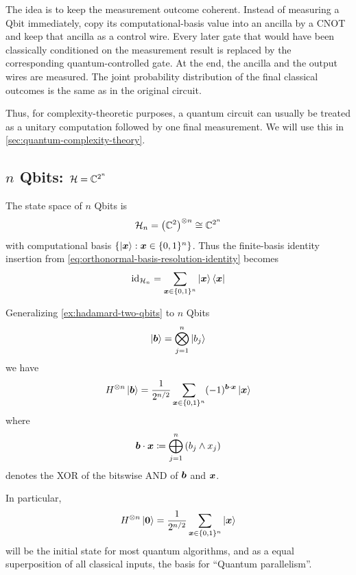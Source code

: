 The idea is to keep the measurement outcome coherent.
Instead of measuring a Qbit immediately, copy its computational-basis value into an ancilla by a CNOT and keep that ancilla as a control wire.
Every later gate that would have been classically conditioned on the measurement result is replaced by the corresponding quantum-controlled gate.
At the end, the ancilla and the output wires are measured.
The joint probability distribution of the final classical outcomes is the same as in the original circuit.

Thus, for complexity-theoretic purposes, a quantum circuit can usually be treated as a unitary computation followed by one final measurement. We will use this in \autoref{sec:quantum-complexity-theory}.



\subsection{$n$ Qbits: $\mathcal{H} = \mathbb{C}^{2^n}$}
\label{sec:n-Qbits}

The state space of \(n\) Qbits is
\[
\mathcal H_n
=
\left(\mathbb{C}^2\right)^{\otimes n}
\cong
\mathbb{C}^{2^n}
\]
with computational basis 
$
\left\{\ket{{\boldsymbol{x}}}:{\boldsymbol{x}}\in\{0,1\}^n\right\}
$.
Thus the finite-basis identity insertion from \eqref{eq:orthonormal-basis-resolution-identity} becomes
\begin{equation}\label{eq:computational-basis-resolution-identity}
\operatorname{id}_{\mathcal H_n}
=
\sum_{{\boldsymbol{x}}\in\{0,1\}^{n}}\ket{{\boldsymbol{x}}}\bra{{\boldsymbol{x}}} 
\end{equation}


\begin{example}\label{ex:hadamard-n-qbits}
Generalizing \autoref{ex:hadamard-two-qbits} to \(n\) Qbits
\[
\ket{{\boldsymbol{b}}} = \bigotimes_{j=1}^n \ket{b_j}
\]
we have
\begin{equation}\label{eq:nfold-hadamard-general}
H^{\otimes n}\ket{{\boldsymbol{b}}}=\frac{1}{2^{n / 2}} \sum_{{\boldsymbol{x}} \in \{0,1\}^n}(-1)^{{\boldsymbol{b}} \cdot {\boldsymbol{x}}}\ket{{\boldsymbol{x}}}
\end{equation}
where
\begin{equation}\label{eq:logical-scalar-product}
{\boldsymbol{b}} \cdot {\boldsymbol{x}} 
\coloneq 
\bigoplus_{j=1}^n \left(b_j \wedge x_j\right)
\end{equation}
denotes the XOR of the bitswise AND of ${\boldsymbol{b}}$ and ${\boldsymbol{x}}$.


In particular,
\begin{equation}\label{eq:nfold-hadamard-zero}
H^{\otimes n}\ket{{\boldsymbol{0}}}
=
\frac{1}{2^{n / 2}} \sum_{{\boldsymbol{x}} \in \{0,1\}^n} \ket{{\boldsymbol{x}}}
\end{equation}
will be the initial state for most quantum algorithms, and as a equal superposition of all classical inputs, the basis for ``Quantum parallelism''.
\end{example}





